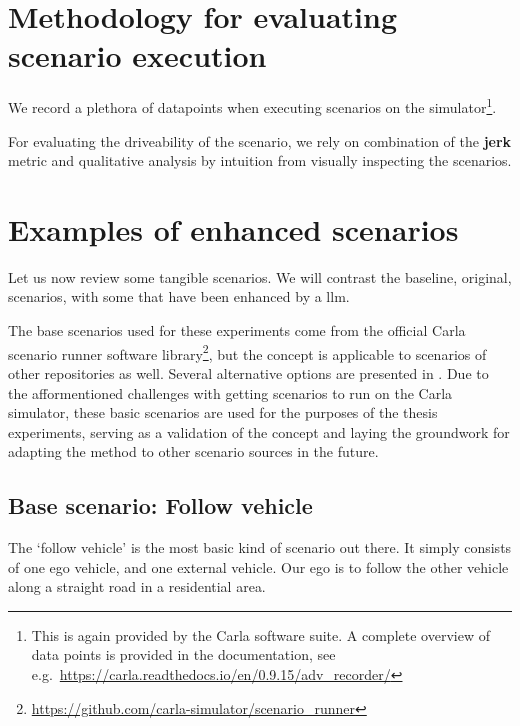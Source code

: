 \section{Methodology for evaluating scenario execution}

We record a plethora of datapoints when executing scenarios on the simulator\footnote{This is again
    provided by the Carla software suite. A complete overview of data points is provided in the
    documentation, see e.g.~\url{https://carla.readthedocs.io/en/0.9.15/adv_recorder/}}.

For evaluating the driveability of the scenario, we rely on combination of the \textbf{jerk} metric
and qualitative analysis by intuition from visually inspecting the scenarios.

\section{Examples of enhanced scenarios}

Let us now review some tangible scenarios. We will contrast the baseline, original, scenarios, with
some that have been enhanced by a \acrshort{llm}.

The base scenarios used for these experiments come from the official Carla scenario runner software
library\footnote{\url{https://github.com/carla-simulator/scenario_runner}}, but the concept is
applicable to scenarios of other repositories as well. Several alternative options are presented in
. Due to the afformentioned challenges with getting scenarios to run on the
Carla simulator, these basic scenarios are used for the purposes of the thesis experiments, serving
as a validation of the concept and laying the groundwork for adapting the method to other scenario
sources in the future.

\subsection{Base scenario: Follow vehicle}\label{sec:followVehicleResults}

The `follow vehicle' is the most basic kind of scenario out there. It simply consists of one ego
vehicle, and one external vehicle. Our ego is to follow the other vehicle along a straight road in a
residential area.

